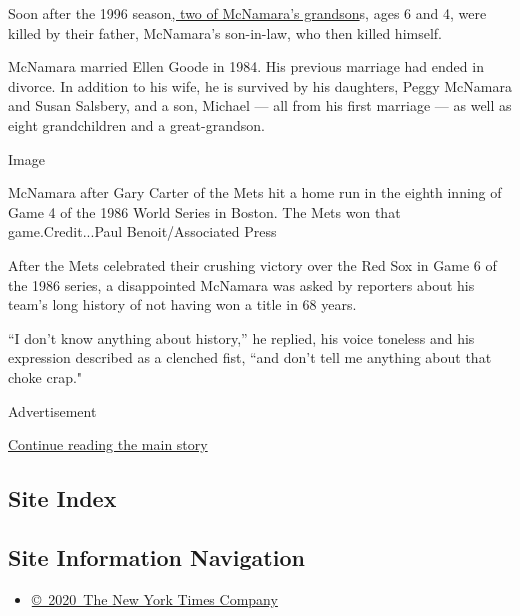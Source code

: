 Soon after the 1996
season\href{https://www.upi.com/Archives/1996/10/17/McNamara-grandsons-killed-by-dad/8841845524800/}{,
two of McNamara's grandson}s, ages 6 and 4, were killed by their father,
McNamara's son-in-law, who then killed himself.

McNamara married Ellen Goode in 1984. His previous marriage had ended in
divorce. In addition to his wife, he is survived by his daughters, Peggy
McNamara and Susan Salsbery, and a son, Michael --- all from his first
marriage --- as well as eight grandchildren and a great-grandson.

Image

McNamara after Gary Carter of the Mets hit a home run in the eighth
inning of Game 4 of the 1986 World Series in Boston. The Mets won that
game.Credit...Paul Benoit/Associated Press

After the Mets celebrated their crushing victory over the Red Sox in
Game 6 of the 1986 series, a disappointed McNamara was asked by
reporters about his team's long history of not having won a title in 68
years.

``I don't know anything about history,'' he replied, his voice toneless
and his expression described as a clenched fist, ``and don't tell me
anything about that choke crap."

Advertisement

\protect\hyperlink{after-bottom}{Continue reading the main story}

\hypertarget{site-index}{%
\subsection{Site Index}\label{site-index}}

\hypertarget{site-information-navigation}{%
\subsection{Site Information
Navigation}\label{site-information-navigation}}

\begin{itemize}
\tightlist
\item
  \href{https://help.nytimes.com/hc/en-us/articles/115014792127-Copyright-notice}{©~2020~The
  New York Times Company}
\end{itemize}


